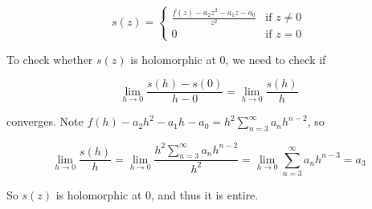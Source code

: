 	      \begin{equation*}
		      s(z) = \begin{cases}
			      \frac{f(z)-a_2z^2-a_1z-a_0}{z^2} & \text{if } z
			      \neq 0
			      \\
			      0                                & \text{if } z =
			      0
		      \end{cases}
	      \end{equation*}

	      To check whether $s(z)$ is holomorphic at $0$, we need to check
	      if

	      \begin{equation*}
		      \lim_{h \to 0}\frac{s(h) - s(0)}{h-0} = \lim_{h \to
			      0}\frac{s(h)}{h}
	      \end{equation*}

	      converges.
	      Note $f(h) - a_2h^2 - a_1h - a_0 = h^2\sum_{n=3}^\infty a_n
		      h^{n-2}$, so

	      \begin{equation*}
		      \lim_{h \to 0}\frac{s(h)}{h} = \lim_{h \to
			      0}\frac{h^2\sum_{n=3}^\infty a_n h^{n-2}}{h^2} =
		      \lim_{h \to
			      0}\sum_{n=3}^\infty a_n h^{n-3} = a_3
	      \end{equation*}

	      So $s(z)$ is holomorphic at $0$, and thus it is entire.